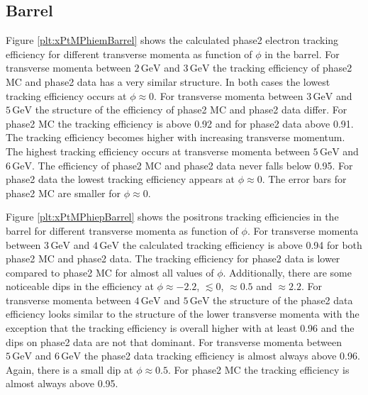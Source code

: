 \documentclass[a4paper,11pt,twosided,final,german,openbib,pdftex,listof=totoc,bibliography=totoc]{scrbook}
\begin{document}
\newpage

\subsection{Barrel}

Figure \ref{plt:xPtMPhiemBarrel} shows the calculated phase2 electron tracking efficiency for different transverse momenta as function of $\phi$ in the barrel. For transverse momenta between $2\,\textrm{GeV}$ and $3\,\textrm{GeV}$ the tracking efficiency of phase2 MC and phase2 data has a very similar structure. In both cases the lowest tracking efficiency occurs at $\phi \approx 0$. 
For transverse momenta between $3\,\textrm{GeV}$ and $5\,\textrm{GeV}$ the structure of the efficiency of phase2 MC and phase2 data differ. For phase2 MC the tracking efficiency is above 0.92 and for phase2 data above 0.91. The tracking efficiency becomes higher with increasing transverse momentum. The highest tracking efficiency occurs at transverse momenta between $5\,\textrm{GeV}$ and $6\,\textrm{GeV}$. The efficiency of phase2 MC and phase2 data never falls below 0.95. 
For phase2 data the lowest tracking efficiency appears at $\phi \approx 0$. The error bars for phase2 MC are smaller for $\phi \approx 0$.


Figure \ref{plt:xPtMPhiepBarrel} shows the positrons tracking efficiencies in the barrel for different transverse momenta as function of $\phi$. 
For transverse momenta between $3\,\textrm{GeV}$ and $4\,\textrm{GeV}$ the calculated tracking efficiency is above 0.94 for both phase2 MC and phase2 data. The tracking efficiency for phase2 data is lower compared to phase2 MC for almost all values of $\phi$. Additionally, there are some noticeable dips in the efficiency at $\phi \approx -2.2$, $ \lesssim 0$, $ \approx 0.5$ and $ \approx 2.2$. 
For transverse momenta between $4\,\textrm{GeV}$ and $5\,\textrm{GeV}$ the structure of the phase2 data efficiency looks similar to the structure of the lower transverse momenta with the exception that the tracking efficiency is overall higher with at least 0.96 and the dips on phase2 data are not that dominant. 
For transverse momenta between $5\,\textrm{GeV}$ and $6\,\textrm{GeV}$ the phase2 data tracking efficiency is almost always above 0.96. Again, there is a small dip at $\phi \approx 0.5$. For phase2 MC the tracking efficiency is almost always above 0.95. 
\end{document}
